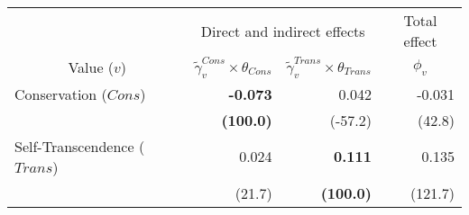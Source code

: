
\begin{tabular}{lrrr}
\toprule
\multicolumn{1}{c}{ } & \multicolumn{2}{c}{Direct and indirect effects} & \multicolumn{1}{c}{Total effect} \\
\cmidrule(l{3pt}r{3pt}){2-3} \cmidrule(l{3pt}r{3pt}){4-4}
\multicolumn{1}{c}{Value ($v$)} & \multicolumn{1}{c}{$\widetilde{\gamma}^{Cons}_v \times \theta_{Cons}$} & \multicolumn{1}{c}{$\widetilde{\gamma}^{Trans}_v \times \theta_{Trans}$} & \multicolumn{1}{c}{${\phi}_v$}\\
\midrule
Conservation ($Cons$) & \textbf{-0.073} & 0.042 & -0.031\\
 & \textbf{(100.0)} & (-57.2) & (42.8)\\
Self-Transcendence ($Trans$) & 0.024 & \textbf{0.111} & 0.135\\
 & (21.7) & \textbf{(100.0)} & (121.7)\\
\bottomrule
\end{tabular}
